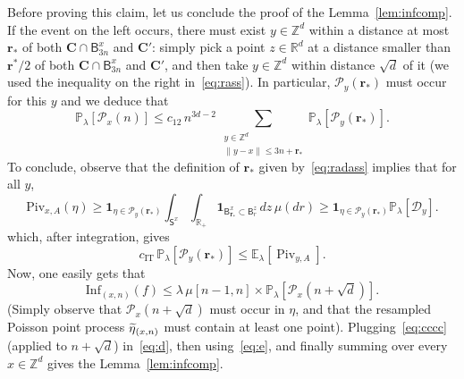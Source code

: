 \documentclass[10pt]{amsart}
\theoremstyle{definition}\newtheorem{defi}[theo]{Definition}\newtheorem{rema}[theo]{Remark}\newtheorem{exam}[theo]{Example}\newtheorem{exem}[theo]{Example}\newtheorem{nota}[theo]{Notation}
\newcommand{\infl}{\mathrm{Inf}}
\newcommand{\rbf}{\mathbf{r}}
\newcommand{\Cbf}{\mathbf{C}}
\DeclareMathOperator{\IT}{IT}
\DeclareMathOperator{\Piv}{Piv}
\let\oldtilde\tilde
\renewcommand*{\tilde}[1]{\mathchoice{\widetilde{#1}}{\widetilde{#1}}{\oldtilde{#1}}{\oldtilde{#1}}}
\begin{document}
Before proving this claim, let us conclude the proof of the Lemma~\ref{lem:infcomp}. If the event on the left occurs, there must exist $y\in {\mathbb Z}^d$ within a distance at most ${\rbf_*}$ of both ${\Cbf}\cap\mathsf B^x_{3n}$ and ${\Cbf}'$: simply pick a point $z\in{\mathbb R}^d$ at a distance smaller than ${\rbf^*}/2$ of both ${\Cbf}\cap\mathsf B^x_{3n}$ and ${\Cbf'}$, and then take $y\in{\mathbb Z}^d$ within distance $\sqrt d$ of it (we used the inequality on the right in~\eqref{eq:rass}). In particular, ${\mathcal P}_y({\rbf_*})$ must occur for this $y$ and we deduce that
\begin{equation}\label{eq:cccc}
{\mathbb P}_\lambda[{\mathcal P}_x(n)]\le c_{12}\,n^{3d-2}\,\sum_{\substack{y\in{\mathbb Z}^d\\ \|y-x\|\le 3n+\rbf_*}}{\mathbb P}_\lambda[{\mathcal P}_y(\rbf_*)].
\end{equation}
To conclude, observe that the definition of ${\rbf_*}$ given by~\eqref{eq:radass} implies that for all $y$,
\[
\text{Piv}_{x,A} (\eta) \ge \mathbf 1_{\eta \in {\mathcal P}_y({\rbf_*})}\int_{\mathsf S^x} \int_{{\mathbb R}_+} \mathbf 1_{\mathsf B_{\rbf_*}^x\subset \mathsf B_r^z} \,dz \, \mu(d r)\ge \mathbf 1_{\eta \in {\mathcal P}_y({\rbf_*})}{\mathbb P}_\lambda[{\mathcal D}_y].
\]
which, after integration, gives
\begin{equation}\label{eq:e}
{c_{\IT}}\,{\mathbb P}_\lambda[{\mathcal P}_y({\rbf_*})]\le {\mathbb E}_\lambda[{\Piv}_{y,A}].
\end{equation}
Now, one easily gets that
\begin{equation}\label{eq:d}
\infl_{(x,n)}(f) \le \lambda \, \mu[n-1,n]\times {\mathbb P}_\lambda\left[{\mathcal P}_x\left(n+\sqrt d\right)\right].
\end{equation}
(Simply observe that ${\mathcal P}_x(n+\sqrt d)$ must occur in $\eta$, and that the resampled Poisson point process $\tilde\eta_{(x,n)}$ must contain at least one point). Plugging~\eqref{eq:cccc} (applied to $n+\sqrt d$) in~\eqref{eq:d}, then using~\eqref{eq:e}, and finally summing over every $x\in{\mathbb Z}^d$ gives the Lemma~\ref{lem:infcomp}.
\end{document}
